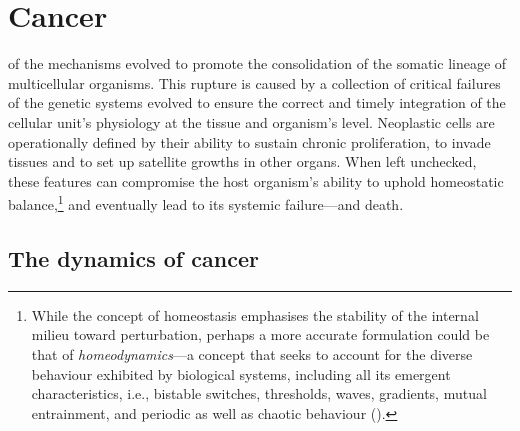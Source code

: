\section{Cancer}


 of the mechanisms evolved to
promote the consolidation of the somatic lineage of multicellular
organisms.  This rupture is caused by a collection of critical
failures of the genetic systems evolved to ensure the correct and
timely integration of the cellular unit's physiology at the tissue and
organism's level.\cite{maynard_smith_major_1997} Neoplastic cells are
operationally defined by their ability to sustain chronic
proliferation, to invade tissues and to set up satellite growths in
other organs.  When left unchecked, these features can compromise the
host organism's ability to uphold homeostatic balance,\footnote{While
  the concept of homeostasis emphasises the stability of the internal
  milieu toward perturbation, perhaps a more accurate formulation
  could be that of \mbox{\emph{homeodynamics}}---a concept that seeks
  to account for the diverse behaviour exhibited by biological
  systems, including all its emergent characteristics, i.e., bistable
  switches, thresholds, waves, gradients, mutual entrainment, and
  periodic as well as chaotic behaviour (\citealp{lloyd_why_2001}).}
and eventually lead to its systemic failure---and death.

\bigskip



\subsection{The dynamics of cancer}
\label{sec:dynamics-cancer}

